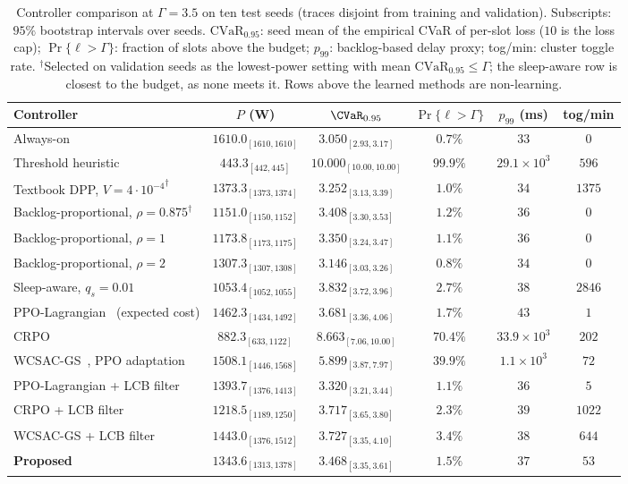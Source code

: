 \begin{table}[t]
  \centering
  \caption{Controller comparison at $\Gamma=3.5$ on ten test seeds (traces disjoint from training and validation). Subscripts: $95\%$ bootstrap intervals over seeds. $\mathrm{CVaR}_{0.95}$: seed mean of the empirical CVaR of per-slot loss ($10$ is the loss cap); $\Pr\{\ell{>}\Gamma\}$: fraction of slots above the budget; $p_{99}$: backlog-based delay proxy; tog/min: cluster toggle rate. $^\dagger$Selected on validation seeds as the lowest-power setting with mean $\mathrm{CVaR}_{0.95}\le\Gamma$; the sleep-aware row is closest to the budget, as none meets it. Rows above the learned methods are non-learning.}
  \label{tab:headline}
  \footnotesize
  \setlength{\tabcolsep}{7pt}
  \begin{tabular}{@{}lccccc@{}}
    \toprule
    Controller & $P$ (W) & $\CVaR_{0.95}$ & $\Pr\{\ell{>}\Gamma\}$ & $p_{99}$ (ms) & tog/min \\
    \midrule
    Always-on & $1610.0_{[1610,1610]}$ & $3.050_{[2.93,3.17]}$ & $0.7\%$ & $33$ & $0$ \\
    Threshold heuristic & $443.3_{[442,445]}$ & $10.000_{[10.00,10.00]}$ & $99.9\%$ & $29.1\!\times\!10^{3}$ & $596$ \\
    Textbook DPP, $V\!=\!{4\!\cdot\!10^{-4}}^\dagger$ & $1373.3_{[1373,1374]}$ & $3.252_{[3.13,3.39]}$ & $1.0\%$ & $34$ & $1375$ \\
    Backlog-proportional, $\rho\!=\!0.875^\dagger$ & $1151.0_{[1150,1152]}$ & $3.408_{[3.30,3.53]}$ & $1.2\%$ & $36$ & $0$ \\
    Backlog-proportional, $\rho\!=\!1$ & $1173.8_{[1173,1175]}$ & $3.350_{[3.24,3.47]}$ & $1.1\%$ & $36$ & $0$ \\
    Backlog-proportional, $\rho\!=\!2$ & $1307.3_{[1307,1308]}$ & $3.146_{[3.03,3.26]}$ & $0.8\%$ & $34$ & $0$ \\
    Sleep-aware, $q_s\!=\!0.01$ & $1053.4_{[1052,1055]}$ & $3.832_{[3.72,3.96]}$ & $2.7\%$ & $38$ & $2846$ \\
    \midrule
    PPO-Lagrangian~\cite{Ray_SafetyGym2019} (expected cost) & $1462.3_{[1434,1492]}$ & $3.681_{[3.36,4.06]}$ & $1.7\%$ & $43$ & $1$ \\
    CRPO~\cite{Xu_CRPO_ICML2021} & $882.3_{[633,1122]}$ & $8.663_{[7.06,10.00]}$ & $70.4\%$ & $33.9\!\times\!10^{3}$ & $202$ \\
    WCSAC-GS~\cite{Yang_WCSAC_ML2023}, PPO adaptation & $1508.1_{[1446,1568]}$ & $5.899_{[3.87,7.97]}$ & $39.9\%$ & $1.1\!\times\!10^{3}$ & $72$ \\
    PPO-Lagrangian + LCB filter & $1393.7_{[1376,1413]}$ & $3.320_{[3.21,3.44]}$ & $1.1\%$ & $36$ & $5$ \\
    CRPO + LCB filter & $1218.5_{[1189,1250]}$ & $3.717_{[3.65,3.80]}$ & $2.3\%$ & $39$ & $1022$ \\
    WCSAC-GS + LCB filter & $1443.0_{[1376,1512]}$ & $3.727_{[3.35,4.10]}$ & $3.4\%$ & $38$ & $644$ \\
    \textbf{Proposed} & $1343.6_{[1313,1378]}$ & $3.468_{[3.35,3.61]}$ & $1.5\%$ & $37$ & $53$ \\
    \bottomrule
  \end{tabular}
\end{table}
